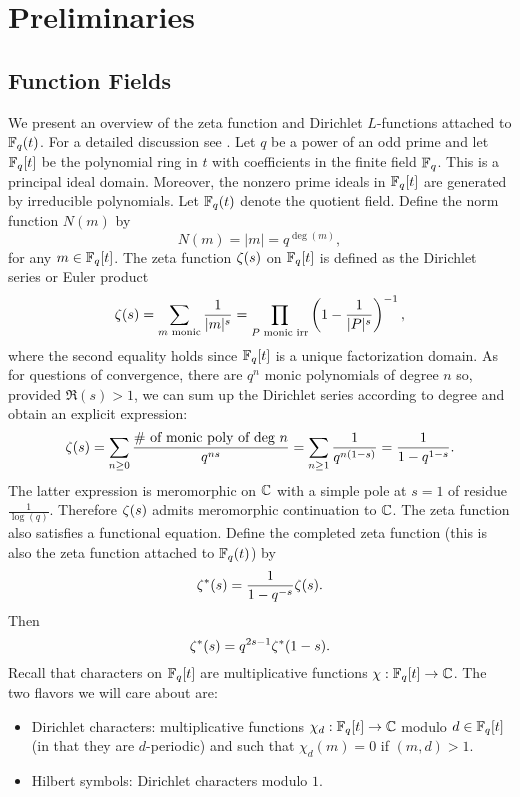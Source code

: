 \section{Preliminaries}
    \subsection*{Function Fields}
        We present an overview of the zeta function and Dirichlet $L$-functions attached to $\mathbb{F}_{q}(t)$. For a detailed discussion see \cite{rosen2002number}. Let $q$ be a power of an odd prime and let $\mathbb{F}_{q}[t]$ be the polynomial ring in $t$ with coefficients in the finite field $\mathbb{F}_{q}$. This is a principal ideal domain. Moreover, the nonzero prime ideals in $\mathbb{F}_{q}[t]$ are generated by irreducible polynomials. Let $\mathbb{F}_{q}(t)$ denote the quotient field. Define the norm function $N(m)$ by
        \[
            N(m) = |m| = q^{\deg(m)},
        \]
        for any $m \in \mathbb{F}_{q}[t]$. The zeta function $\zeta(s)$ on $\mathbb{F}_{q}[t]$ is defined as the Dirichlet series or Euler product
        \[
            \zeta(s) = \sum_{\text{$m$ monic}}\frac{1}{|m|^{s}} = \prod_{\text{$P$ monic irr}}\left(1-\frac{1}{|P|^{s}}\right)^{-1},
        \]
        where the second equality holds since $\mathbb{F}_{q}[t]$ is a unique factorization domain. As for questions of convergence, there are $q^{n}$ monic polynomials of degree $n$ so, provided $\Re(s) > 1$, we can sum up the Dirichlet series according to degree and obtain an explicit expression:
        \[
            \zeta(s) = \sum_{n \ge 0}\frac{\text{\# of monic poly of deg $n$}}{q^{ns}} = \sum_{n \ge 1}\frac{1}{q^{n(1-s)}} = \frac{1}{1-q^{1-s}}.
        \]
        The latter expression is meromorphic on $\mathbb{C}$ with a simple pole at $s = 1$ of residue $\frac{1}{\log(q)}$. Therefore $\zeta(s)$ admits meromorphic continuation to $\mathbb{C}$. The zeta function also satisfies a functional equation. Define the completed zeta function (this is also the zeta function attached to $\mathbb{F}_{q}(t)$) by
        \[
            \zeta^{\ast}(s) = \frac{1}{1-q^{-s}}\zeta(s).
        \]
        Then
        \[
            \zeta^{\ast}(s) = q^{2s-1}\zeta^{\ast}(1-s).
        \]
        Recall that characters on $\mathbb{F}_{q}[t]$ are multiplicative functions $\chi:\mathbb{F}_{q}[t] \to \mathbb{C}$. The two flavors we will care about are:
        
        \begin{itemize}
            \item Dirichlet characters: multiplicative functions $\chi_{d}:\mathbb{F}_{q}[t] \to \mathbb{C}$ modulo $d \in \mathbb{F}_{q}[t]$ (in that they are $d$-periodic) and such that $\chi_{d}(m) = 0$ if $(m,d) > 1$.
            \item Hilbert symbols: Dirichlet characters modulo $1$.
        \end{itemize}
        
